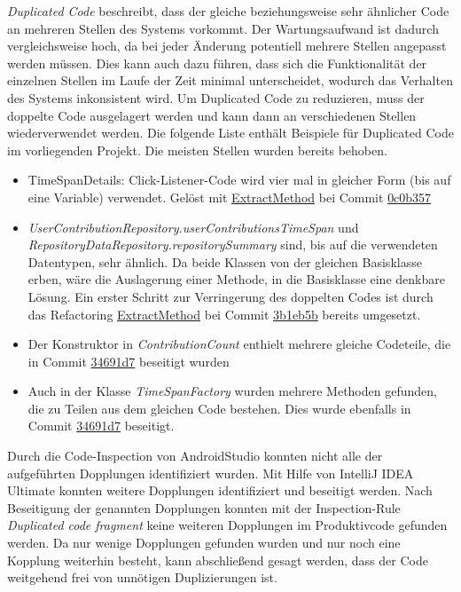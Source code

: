 \textit{Duplicated Code} beschreibt, dass der gleiche beziehungsweise sehr ähnlicher Code an mehreren Stellen des Systems vorkommt.
Der Wartungsaufwand ist dadurch vergleichsweise hoch, da bei jeder Änderung potentiell mehrere Stellen angepasst werden müssen.
Dies kann auch dazu führen, dass sich die Funktionalität der einzelnen Stellen im Laufe der Zeit minimal unterscheidet, wodurch das Verhalten des Systems inkonsistent wird.
Um Duplicated Code zu reduzieren, muss der doppelte Code ausgelagert werden und kann dann an verschiedenen Stellen wiederverwendet werden.
Die folgende Liste enthält Beispiele für Duplicated Code im vorliegenden Projekt.
Die meisten Stellen wurden bereits behoben.
\begin{itemize}
	\item{TimeSpanDetails: Click-Listener-Code wird vier mal in gleicher Form (bis auf eine Variable) verwendet. Gelöst mit {\hyperref[sec:ExtractMethod_TimeSpanDetails]{ExtractMethod}} bei Commit \href{https://github.com/lukaspanni/OpenSourceStats/commit/0c0b357dee742575d8465ae26e64152bfecbf5ab} {0c0b357}}
	
	\item{\textit{UserContributionRepository.userContributionsTimeSpan} und \textit{RepositoryDataRepository.repositorySummary} sind, bis auf die verwendeten Datentypen, sehr ähnlich. 
Da beide Klassen von der gleichen Basisklasse erben, wäre die Auslagerung einer Methode, in die Basisklasse eine denkbare Lösung.
\newline
Ein erster Schritt zur Verringerung des doppelten Codes ist durch das Refactoring {\hyperref[sec:ExtractMethod_Repository]{ExtractMethod}} bei Commit \href{https://github.com/lukaspanni/OpenSourceStats/commit/3b1eb5bf6750c3ccaeb05962ec8a8ae743adbf2c} {3b1eb5b} bereits umgesetzt.} 		
  \item{Der Konstruktor in \textit{ContributionCount} enthielt mehrere gleiche Codeteile, die in Commit \href{https://github.com/lukaspanni/OpenSourceStats/commit/34691d7b3b4bf00c483ce5c99d8e412f2732b6b1} {34691d7} beseitigt wurden}
  
  \item {Auch in der Klasse \textit{TimeSpanFactory} wurden mehrere Methoden gefunden, die zu Teilen aus dem gleichen Code bestehen. Dies wurde ebenfalls in Commit \href{https://github.com/lukaspanni/OpenSourceStats/commit/34691d7b3b4bf00c483ce5c99d8e412f2732b6b1} {34691d7} beseitigt.}
\end{itemize}
Durch die Code-Inspection von AndroidStudio konnten nicht alle der aufgeführten Dopplungen identifiziert wurden.
Mit Hilfe von IntelliJ IDEA Ultimate konnten weitere Dopplungen identifiziert und beseitigt werden.
Nach Beseitigung der genannten Dopplungen konnten mit der Inspection-Rule \textit{Duplicated code fragment} keine weiteren Dopplungen im Produktivcode gefunden werden.
Da nur wenige Dopplungen gefunden wurden und nur noch eine Kopplung weiterhin besteht, kann abschließend gesagt werden, dass der Code weitgehend frei von unnötigen Duplizierungen ist.

